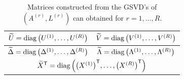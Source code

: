 \documentclass[12pt]{article}
\begin{document}
\begin{table}[ht!]
  \begin{center}
    \caption{Matrices constructed from the GSVD's of $(A^{(r)},L^{(r)})$ can obtained for $r = 1,\ldots,R$.}
    \label{tab:Block GSVD Matrices}
    \begin{tabular}{|c|c|}
    \hline
    $\widetilde{U} = \operatorname{diag}\left(U^{(1)},\ldots,U^{(R)}\right)$ & $\widetilde{V} = \operatorname{diag}\left(V^{(1)},\ldots,V^{(R)}\right)$ \\
    \hline
    $\widetilde{\Delta} = \operatorname{diag}\left(\Delta^{(1)},\ldots,\Delta^{(R)}\right)$ & $\widetilde{\Lambda} = \operatorname{diag}\left(\Lambda^{(1)},\ldots,\Lambda^{(R)}\right)$ \\
    \hline
    \multicolumn{2}{|c|}{${\widetilde{X}}^\mathsf{T} = \operatorname{diag}\left({\left(X^{(1)}\right)}^\mathsf{T},\ldots,{\left(X^{(R)}\right)}^\mathsf{T}\right)$} \\
    \hline
    \end{tabular}
  \end{center}
\end{table}
\end{document}
